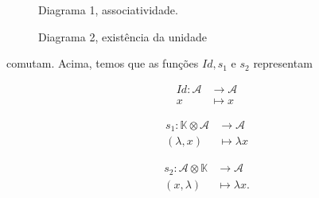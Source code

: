\documentclass[twoside,openright,titlepage,numbers=noenddot,headinclude,  lineheaders footinclude=true,cleardoublepage=empty,
                                BCOR=5mm,paper=a4,fontsize=12pt ]{scrbook}
\theoremstyle{definition}
\begin{document}
\begin{figure}[h]
\centering
\begin{minipage}{.5\textwidth}
\centering
\vspace{.55cm}
\caption*{Diagrama 1, associatividade.}
\end{minipage}%
\begin{minipage}{.5\textwidth}
\centering
\caption*{Diagrama 2, existência da unidade}
\end{minipage}
\end{figure}
comutam. Acima, temos que as funções $Id, s_1$ e $s_2$ representam

\begin{minipage}{.33\textwidth}
    \begin{align*}
        Id: \mathcal{A} & \rightarrow \mathcal{A}\\
        x & \mapsto x
    \end{align*}
\end{minipage}%
\begin{minipage}{.33\textwidth}
    \begin{align*}
        s_1: \mathbb{K} \otimes \mathcal{A}  & \rightarrow \mathcal{A}\\
        (\lambda, x) & \mapsto \lambda x
    \end{align*}
\end{minipage}%
\begin{minipage}{.33\textwidth}
    \begin{align*}
        s_2: \mathcal{A} \otimes \mathbb{K}  & \rightarrow \mathcal{A}\\
        (x, \lambda) & \mapsto \lambda x.
    \end{align*}
\end{minipage}
\end{document}
